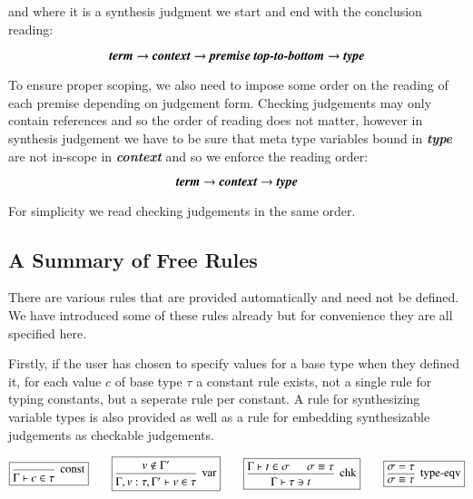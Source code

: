{and where it is a synthesis judgment we start and end with the
conclusion reading:

$$\mbox{\textbf{\emph{term}}} \to \textbf{\emph{context}} \to
\mbox{\textbf{\emph{premise top-to-bottom}}} \to
\mbox{\textbf{\emph{type}}}$$ 

To ensure proper scoping, we also need to impose some order on the reading of
each premise depending on judgement form. Checking judgements may only
contain references and so the order of reading does not matter,
however in synthesis judgement we have to be sure that meta type
variables bound in \textbf{\emph{type}} are not in-scope in
\textbf{\emph{context}} and so we enforce the reading order:

$$\mbox{\textbf{\emph{term}}} \to \mbox{\textbf{\emph{context}}} \to \mbox{\textbf{\emph{type}}}$$

For simplicity we read checking judgements in the same order.

\subsection{A Summary of Free Rules}

There are various rules that are provided automatically and need not
be defined. We have introduced some of these rules already but for
convenience they are all specified here.

Firstly, if the user has chosen to specify values for a base type when
they defined it, for each value $c$ of base type $\tau$ a constant
rule exists, not a single rule for typing constants, but a seperate
rule per constant. A rule for synthesizing variable types is also
provided as well as a rule for embedding synthesizable judgements as
checkable judgements.

$$
\boxed{
\mbox{\begin {prooftree}
  \infer0[const]{\Gamma \vdash c \in \tau}
\end {prooftree}}
}
\qquad
\boxed{
  \mbox{\begin {prooftree}
  \hypo{v \notin \Gamma '}    
  \infer1[var]{\Gamma , v : \tau , \Gamma ' \vdash v \in \tau}
  \end {prooftree}}
}
\qquad
\boxed{
  \mbox{\begin {prooftree}
  \hypo{\Gamma \vdash t \in \sigma}
  \hypo{\sigma \equiv \tau}
  \infer2[chk]{\Gamma \vdash \tau \ni t}
\end {prooftree}}  
}
\qquad
\boxed{
  \mbox{\begin {prooftree}
  \hypo{\sigma = \tau}
  \infer1[type-eqv]{\sigma \equiv \tau}
\end {prooftree}}  
}
$$

}
